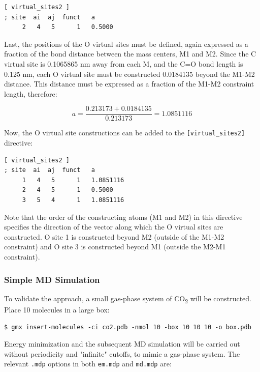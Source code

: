 \documentclass[9pt,tutorial,pubversion]{livecoms}
\begin{document}
\begin{lstlisting}
[ virtual_sites2 ]
; site  ai  aj  funct   a
     2   4   5      1   0.5000
\end{lstlisting}

Last, the positions of the O virtual sites must be defined, again expressed as a fraction of the bond distance between the mass centers, M1 and M2. Since the C virtual site is 0.1065865 nm away from each M, and the C=O bond length is 0.125 nm, each O virtual site must be constructed 0.0184135 beyond the M1-M2 distance. This distance must be expressed as a fraction of the M1-M2 constraint length, therefore:

\begin{equation}
a = \frac{0.213173+0.0184135}{0.213173} = 1.0851116
\end{equation}

Now, the O virtual site constructions can be added to the \texttt{[virtual\_sites2]} directive:

\begin{lstlisting}
[ virtual_sites2 ]
; site  ai  aj  funct   a
     1   4   5      1   1.0851116
     2   4   5      1   0.5000 
     3   5   4      1   1.0851116
\end{lstlisting}

Note that the order of the constructing atoms (M1 and M2) in this directive specifies the direction of the vector along which the O virtual sites are constructed. O site 1 is constructed beyond M2 (outside of the M1-M2 constraint) and O site 3 is constructed beyond M1 (outside the M2-M1 constraint).

\subsubsection{Simple MD Simulation} \label{vsite_md}

To validate the approach, a small gas-phase system of CO\textsubscript{2} will be constructed. Place 10 molecules in a large box:

\begin{lstlisting}
$ gmx insert-molecules -ci co2.pdb -nmol 10 -box 10 10 10 -o box.pdb
\end{lstlisting}

Energy minimization and the subsequent MD simulation will be carried out without periodicity and "infinite" cutoffs, to mimic a gas-phase system. The relevant \texttt{.mdp} options in both \texttt{em.mdp} and \texttt{md.mdp} are:
\end{document}
